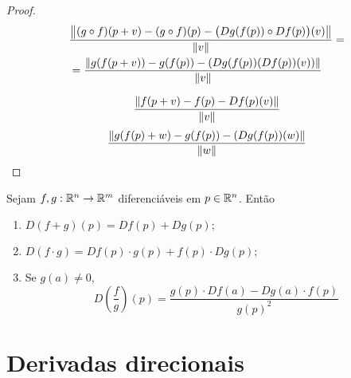 \begin{proof}
	\newpage

	\begin{align*}
	& \frac{\left\Vert{(g \circ f)(p+v) - (g \circ f)(p) - \big(Dg(f(p)) \circ Df(p)\big)(v)}\right\Vert}{\left\Vert{v}\right\Vert}=\\
	&= \frac{\left\Vert{g (f(p+v)) - g(f(p)) - (Dg(f(p))(Df(p))(v))}\right\Vert}{\left\Vert{v}\right\Vert}
	\end{align*}
	
	\begin{equation*}
	 \frac{\left\Vert{f(p+v) - f(p) - Df(p)(v)}\right\Vert}{\left\Vert{v}\right\Vert}
	\end{equation*}
	\begin{equation*}
	 \frac{\left\Vert{g (f(p)+w) - g(f(p)) - (Dg(f(p))(w)}\right\Vert}{\left\Vert{w}\right\Vert}
	\end{equation*}
\end{proof}

\begin{prop}
	Sejam $f,g: \mathbb{R}^n \to \mathbb{R}^m$ diferenciáveis em $p \in \mathbb{R}^n$. Então
	\begin{enumerate}
	\item $D (f+g)(p) = D f(p) + D g(p);$
	\item $D (f \cdot g) = D f(p) \cdot g(p) + f(p) \cdot D g(p);$
	\item Se $g(a) \neq 0$,
	\begin{equation*}
	D \left(\frac{f}{g}\right) (p) = \frac{g(p) \cdot D f(a) - D g (a) \cdot f(p)}{g(p)^2}
	\end{equation*}
	\end{enumerate}
\end{prop}








































\newpage
\section{Derivadas direcionais}

